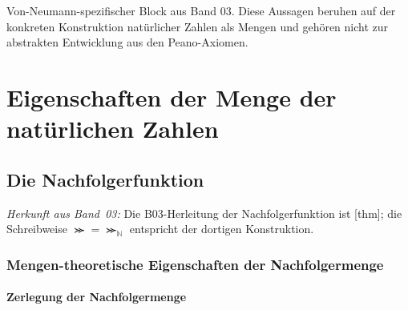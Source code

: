 \documentclass[main.tex]{subfiles}
\begin{document}
\iffalse
Von-Neumann-spezifischer Block aus Band 03. Diese Aussagen beruhen auf der
konkreten Konstruktion natürlicher Zahlen als Mengen und gehören nicht zur
abstrakten Entwicklung aus den Peano-Axiomen.
\section{Eigenschaften der Menge der natürlichen Zahlen}

\subsection{Die Nachfolgerfunktion}

\par\noindent\emph{Herkunft aus Band~03:} Die B03-Herleitung der Nachfolgerfunktion ist
[thm]; die Schreibweise
\(\Succ=\Succ_{\mathbb{N}}\) entspricht der dortigen Konstruktion.\par

\begin{tabproof}
\end{tabproof}

\subsubsection{Mengen-theoretische Eigenschaften der Nachfolgermenge}

\paragraph{Zerlegung der Nachfolgermenge}


\begin{tabproof}



\end{tabproof}
\end{document}
